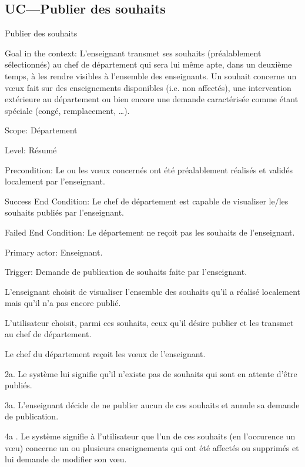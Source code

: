 \begin{ocl}
\subsection{UC---Publier des souhaits}
\begin{usecase}{Publier des souhaits}
\label{usecase:publier}
\begin{information}
	\item[Goal in the context:] L'enseignant transmet ses souhaits (préalablement sélectionnés) au chef de département qui sera lui même apte, dans un deuxième temps, à les rendre visibles à l'ensemble des enseignants.
Un souhait concerne un vœux fait sur des enseignements disponibles (i.e. non affectés), une intervention extérieure au département ou bien encore une demande caractérisée comme étant spéciale (congé, remplacement, \dots). 
	\item[Scope:] Département
	\item[Level:] Résumé
	\item[Precondition:] Le ou les vœux concernés ont été préalablement réalisés et validés localement par l'enseignant.
	\item[Success End Condition:] Le chef de département est capable de visualiser le/les souhaits publiés par l'enseignant.
	\item[Failed End Condition:] Le département ne reçoit pas les souhaits de l'enseignant.
	\item[Primary actor:] Enseignant.
	\item[Trigger:] Demande de publication de souhaits faite par l'enseignant.
\end{information}
\end{usecase}


\begin{scenario}
	\item L'enseignant choisit de visualiser l'ensemble des souhaits qu'il a réalisé localement mais qu'il n'a pas encore publié.
	\item L'utilisateur choisit, parmi ces souhaits, ceux qu'il désire publier et les transmet au chef de département.
	\item Le chef du département reçoit les vœux de l'enseignant.
\end{scenario}

 \begin{extension}
	 \item [2a.] Le système lui signifie qu'il n'existe pas de souhaits qui sont en attente d'être publiés.
	 \item [3a.] L'enseignant décide de ne publier aucun de ces souhaits et annule sa demande de publication.
	 \item [4a]. Le système signifie à l'utilisateur que l'un de ces souhaits (en l'occurence un v\oe u) concerne un ou plusieurs enseignements qui ont été affectés ou supprimés et lui demande de modifier son vœu.\\
 \end{extension}



\end{ocl}
